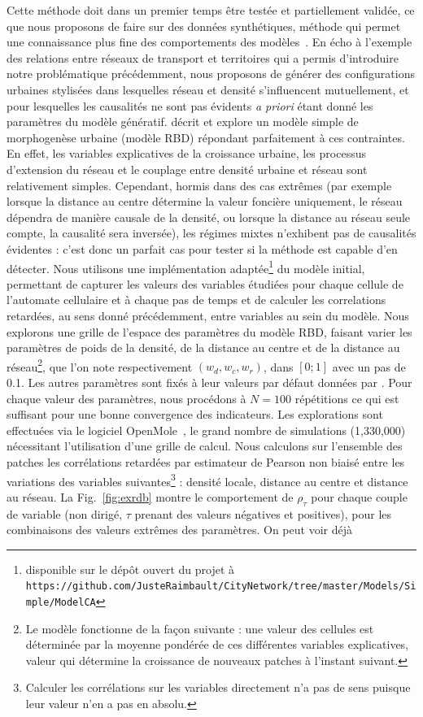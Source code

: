 \documentclass[french]{./sageo}
\begin{document}
Cette méthode doit dans un premier temps être testée et partiellement validée, ce que nous proposons de faire sur des données synthétiques, méthode qui permet une connaissance plus fine des comportements des modèles~\cite{raimbaulthalshs01514415}. En écho à l'exemple des relations entre réseaux de transport et territoires qui a permis d'introduire notre problématique précédemment, nous proposons de générer des configurations urbaines stylisées dans lesquelles réseau et densité s'influencent mutuellement, et pour lesquelles les causalités ne sont pas évidents \emph{a priori} étant donné les paramètres du modèle génératif. \cite{raimbault2014hybrid} décrit et explore un modèle simple de morphogenèse urbaine (modèle RBD) répondant parfaitement à ces contraintes. En effet, les variables explicatives de la croissance urbaine, les processus d'extension du réseau et le couplage entre densité urbaine et réseau sont relativement simples. Cependant, hormis dans des cas extrêmes (par exemple lorsque la distance au centre détermine la valeur foncière uniquement, le réseau dépendra de manière causale de la densité, ou lorsque la distance au réseau seule compte, la causalité sera inversée), les régimes mixtes n'exhibent pas de causalités évidentes : c'est donc un parfait cas pour tester si la méthode est capable d'en détecter. Nous utilisons une implémentation adaptée\footnote{disponible sur le dépôt ouvert du projet à\\\texttt{https://github.com/JusteRaimbault/CityNetwork/tree/master/Models/Simple/ModelCA}} du modèle initial, permettant de capturer les valeurs des variables étudiées pour chaque cellule de l'automate cellulaire et à chaque pas de temps et de calculer les correlations retardées, au sens donné précédemment, entre variables au sein du modèle. Nous explorons une grille de l'espace des paramètres du modèle RBD, faisant varier les paramètres de poids de la densité, de la distance au centre et de la distance au réseau\footnote{Le modèle fonctionne de la façon suivante : une valeur des cellules est déterminée par la moyenne pondérée de ces différentes variables explicatives, valeur qui détermine la croissance de nouveaux patches à l'instant suivant.}, que l'on note respectivement $(w_{d},w_{c},w_{r})$, dans $\left[0;1\right]$ avec un pas de 0.1. Les autres paramètres sont fixés à leur valeurs par défaut données par \cite{raimbault2014hybrid}. Pour chaque valeur des paramètres, nous procédons à $N=100$ répétitions ce qui est suffisant pour une bonne convergence des indicateurs. Les explorations sont effectuées via le logiciel OpenMole~\cite{reuillon2013openmole}, le grand nombre de simulations (1,330,000) nécessitant l'utilisation d'une grille de calcul. Nous calculons sur l'ensemble des patches les corrélations retardées par estimateur de Pearson non biaisé entre les variations des variables suivantes\footnote{Calculer les corrélations sur les variables directement n'a pas de sens puisque leur valeur n'en a pas en absolu.} : densité locale, distance au centre et distance au réseau. La Fig.~\ref{fig:exrdb} montre le comportement de $\rho_{\tau}$ pour chaque couple de variable (non dirigé, $\tau$ prenant des valeurs négatives et positives), pour les combinaisons des valeurs extrêmes des paramètres. On peut voir déjà 
\end{document}
